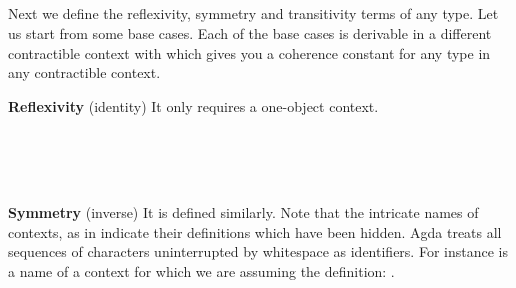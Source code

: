 \begin{code}\>\<%
\\
\> \<[9]%
\>[9]\AgdaSymbol{:}  \AgdaSymbol{\}(} \AgdaSymbol{:}  \AgdaSymbol{)(} \AgdaSymbol{:}  \AgdaSymbol{)}   \<%
\\
\>[0]\<[9]%
\>[9]  \AgdaSymbol{(}  \AgdaSymbol{)}\<%
\\
\> \AgdaSymbol{\{\_\}} \AgdaSymbol{\{}\AgdaSymbol{\}}  \AgdaSymbol{\_}  \AgdaSymbol{=}  \AgdaSymbol{(}  \AgdaSymbol{)} \AgdaSymbol{\_} \AgdaSymbol{\_}\<%
\\
\>\<\end{code}
Next we define the reflexivity, symmetry and transitivity terms of any type. Let us start from some base cases. Each of the base cases is derivable in a different contractible context with  which gives you a coherence constant for any type in any contractible context.

\noindent \textbf{Reflexivity} (identity) It only requires a one-object context.

\begin{code}\>\<%
\\
\> \AgdaSymbol{:}  \AgdaSymbol{\{}\AgdaSymbol{\}} \AgdaSymbol{(}    \AgdaSymbol{)}\<%
\\
\> \AgdaSymbol{=}  \<%
\\
\>\<\end{code}
\noindent  \textbf{Symmetry} (inverse) It is defined similarly. Note that the intricate names of contexts, as in   indicate their definitions which have been hidden. Agda treats all sequences of characters uninterrupted by whitespace as identifiers. For instance  is a name of a context for which we are assuming the definition:
 \AgdaSymbol{=}  \AgdaInductiveConstructor{,} \AgdaInductiveConstructor{*} \AgdaInductiveConstructor{,} \AgdaInductiveConstructor{*} \AgdaInductiveConstructor{,} \AgdaSymbol{(} \AgdaSymbol{(} \AgdaSymbol{)}   \AgdaSymbol{)}.


